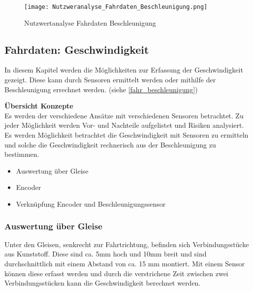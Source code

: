 \documentclass[../../main.tex]{subfiles}
\begin{document}
    \begin{figure}[H]
        \centering
        \texttt{[image: Nutzweranalyse\_Fahrdaten\_Beschleunigung.png]}
        \caption {Nutzwertanalyse Fahrdaten Beschleunigung}
        \label{fig:fahr_nutzwertanalyse_beschleunigung}
    \end{figure}

    \subsection{Fahrdaten: Geschwindigkeit} \label{fahr_geschwindigkeit}
    In diesem Kapitel werden die Möglichkeiten zur Erfassung der Geschwindigkeit gezeigt. Diese kann durch Sensoren ermittelt werden oder mithilfe der Beschleunigung errechnet werden. (siehe \ref{fahr_beschleunigung})

    \textbf{Übersicht Konzepte}\\
    Es werden der verschiedene Ansätze mit verschiedenen Sensoren betrachtet. Zu jeder Möglichkeit werden Vor- und Nachteile aufgelistet und Risiken analysiert.
    Es werden Möglichkeit betrachtet die Geschwindigkeit mit Sensoren zu ermitteln und solche die Geschwindigkeit rechnerisch aus der Beschleunigung zu bestimmen.
    \begin{itemize}
        \item Auswertung über Gleise
        \item Encoder
        \item Verknüpfung Encoder und Beschleunigungssensor
    \end{itemize}

    \subsubsection{Auswertung über Gleise}
    Unter den Gleisen, senkrecht zur Fahrtrichtung, befinden sich Verbindungsstücke aus Kunststoff. Diese sind ca. 5mm hoch und 10mm breit und sind durchschnittlich mit einem Abstand von ca. 15 mm montiert. Mit einem Sensor können diese erfasst werden und durch die verstrichene Zeit zwischen zwei Verbindungsstücken kann die Geschwindigkeit berechnet werden.
\end{document}
